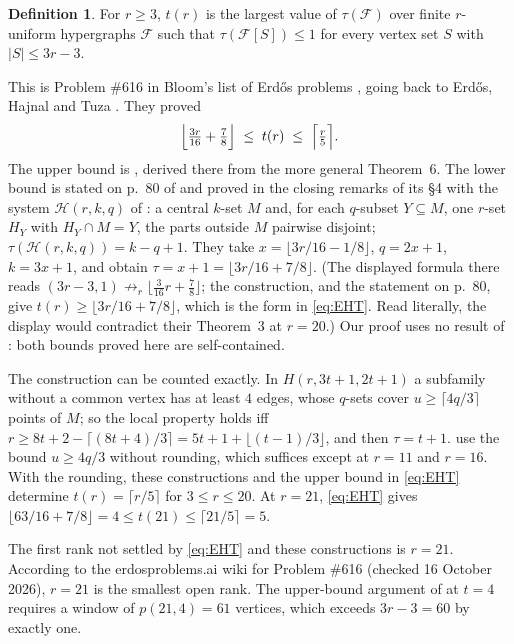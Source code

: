 \documentclass[11pt]{amsart}
\theoremstyle{definition}
\newtheorem{definition}[theorem]{Definition}
\newcommand{\cF}{\mathcal{F}}
\begin{document}
\begin{definition}
For $r\ge 3$, $t(r)$ is the largest value of $\tau(\cF)$ over finite $r$-uniform hypergraphs $\cF$ such that $\tau(\cF[S])\le 1$ for every vertex set $S$ with $|S|\le 3r-3$.
\end{definition}

This is Problem \#616 in Bloom's list of Erd\H{o}s problems \cite{EP616}, going back to Erd\H{o}s, Hajnal and Tuza \cite{EHT91}. They proved
\begin{equation}\label{eq:EHT}
\Bigl\lfloor \tfrac{3r}{16}+\tfrac78\Bigr\rfloor \;\le\; t(r)\;\le\;\Bigl\lceil \tfrac r5\Bigr\rceil .
\end{equation}
The upper bound is \cite[Thm.~3]{EHT91}, derived there from the more general Theorem~6. The lower bound is stated on p.~80 of \cite{EHT91} and proved in the closing remarks of its \S4 with the system $\mathcal H(r,k,q)$ of \cite[\S3]{EHT91}: a central $k$-set $M$ and, for each $q$-subset $Y\subseteq M$, one $r$-set $H_Y$ with $H_Y\cap M=Y$, the parts outside $M$ pairwise disjoint; $\tau(\mathcal H(r,k,q))=k-q+1$. They take $x=\lfloor 3r/16-1/8\rfloor$, $q=2x+1$, $k=3x+1$, and obtain $\tau=x+1=\lfloor 3r/16+7/8\rfloor$. (The displayed formula there reads $(3r-3,1)\not\to_r\lfloor\frac3{16}r+\frac78\rfloor$; the construction, and the statement on p.~80, give $t(r)\ge\lfloor 3r/16+7/8\rfloor$, which is the form in \eqref{eq:EHT}. Read literally, the display would contradict their Theorem~3 at $r=20$.) Our proof uses no result of \cite{EHT91}: both bounds proved here are self-contained.

The construction can be counted exactly. In $H(r,3t+1,2t+1)$ a subfamily without a common vertex has at least $4$ edges, whose $q$-sets cover $u\ge\lceil 4q/3\rceil$ points of $M$; so the local property holds iff $r\ge 8t+2-\lceil(8t+4)/3\rceil=5t+1+\lfloor (t-1)/3\rfloor$, and then $\tau=t+1$. \cite{EHT91} use the bound $u\ge 4q/3$ without rounding, which suffices except at $r=11$ and $r=16$. With the rounding, these constructions and the upper bound in \eqref{eq:EHT} determine $t(r)=\lceil r/5\rceil$ for $3\le r\le 20$. At $r=21$, \eqref{eq:EHT} gives $\lfloor 63/16+7/8\rfloor=4\le t(21)\le\lceil 21/5\rceil=5$.

The first rank not settled by \eqref{eq:EHT} and these constructions is $r=21$. According to the erdosproblems.ai wiki for Problem \#616 (checked 16 October 2026), $r=21$ is the smallest open rank. The upper-bound argument of \cite[Thm.~6]{EHT91} at $t=4$ requires a window of $p(21,4)=61$ vertices, which exceeds $3r-3=60$ by exactly one.
\end{document}
